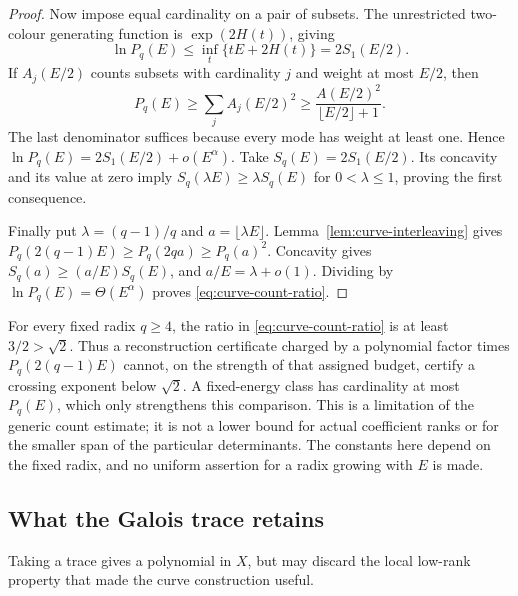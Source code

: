 \begin{proof}
Now impose equal cardinality on a pair of subsets. The unrestricted two-colour generating function is $\exp(2H(t))$, giving
\[
 \ln P_q(E)\leq\inf_t\{tE+2H(t)\}=2S_1(E/2).
\]
If $A_j(E/2)$ counts subsets with cardinality $j$ and weight at most $E/2$, then
\[
 P_q(E)\geq\sum_j A_j(E/2)^2
 \geq\frac{A(E/2)^2}{\lfloor E/2\rfloor+1}.
\]
The last denominator suffices because every mode has weight at least one. Hence
$\ln P_q(E)=2S_1(E/2)+o(E^\alpha)$.
Take $S_q(E)=2S_1(E/2)$. Its concavity and its value at zero imply
$S_q(\lambda E)\geq\lambda S_q(E)$ for $0<\lambda\leq1$, proving the first consequence.

Finally put $\lambda=(q-1)/q$ and $a=\lfloor\lambda E\rfloor$. Lemma~\ref{lem:curve-interleaving} gives
$P_q(2(q-1)E)\geq P_q(2qa)\geq P_q(a)^2$.
Concavity gives $S_q(a)\geq(a/E)S_q(E)$, and $a/E=\lambda+o(1)$. Dividing by $\ln P_q(E)=\Theta(E^\alpha)$ proves \eqref{eq:curve-count-ratio}.
\end{proof}

For every fixed radix $q\geq4$, the ratio in \eqref{eq:curve-count-ratio} is at least $3/2>\sqrt2$. Thus a reconstruction certificate charged by a polynomial factor times $P_q(2(q-1)E)$ cannot, on the strength of that assigned budget, certify a crossing exponent below $\sqrt2$. A fixed-energy class has cardinality at most $P_q(E)$, which only strengthens this comparison. This is a limitation of the generic count estimate; it is not a lower bound for actual coefficient ranks or for the smaller span of the particular determinants. The constants here depend on the fixed radix, and no uniform assertion for a radix growing with $E$ is made.

\subsection{What the Galois trace retains}
Taking a trace gives a polynomial in $X$, but may discard the local low-rank property that made the curve construction useful.


